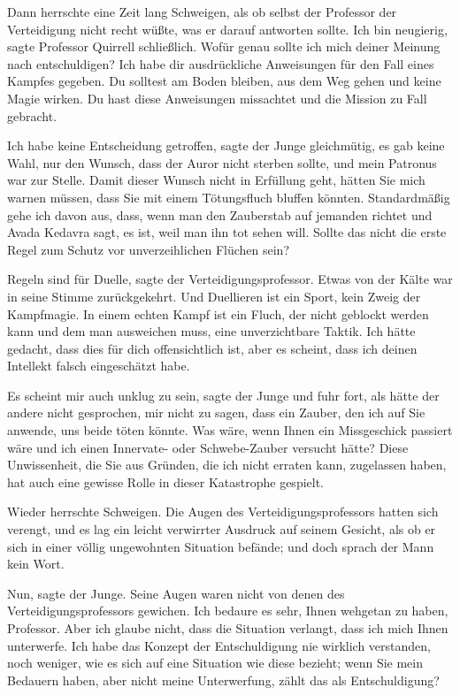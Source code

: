 Dann herrschte eine Zeit lang Schweigen, als ob selbst der Professor der
Verteidigung nicht recht wüßte, was er darauf antworten sollte. \glqq{}Ich bin
neugierig\grqq{}, sagte Professor Quirrell schließlich. \glqq{}Wofür genau sollte
ich mich deiner Meinung nach entschuldigen? Ich habe dir ausdrückliche
Anweisungen für den Fall eines Kampfes gegeben. Du solltest am Boden bleiben,
aus dem Weg gehen und keine Magie wirken. Du hast diese Anweisungen missachtet
und die Mission zu Fall gebracht.\grqq{}

\glqq{}Ich habe keine Entscheidung getroffen\grqq{}, sagte der Junge gleichmütig,
\glqq{}es gab keine Wahl, nur den Wunsch, dass der Auror nicht sterben sollte,
und mein Patronus war zur Stelle. Damit dieser Wunsch nicht in Erfüllung geht,
hätten Sie mich warnen müssen, dass Sie mit einem Tötungsfluch bluffen könnten.
Standardmäßig gehe ich davon aus, dass, wenn man den Zauberstab auf jemanden
richtet und Avada Kedavra sagt, es ist, weil man ihn tot sehen will. Sollte das
nicht die erste Regel zum Schutz vor unverzeihlichen Flüchen sein?\grqq{}

\glqq{}Regeln sind für Duelle\grqq{}, sagte der Verteidigungsprofessor. Etwas von
der Kälte war in seine Stimme zurückgekehrt. \glqq{}Und Duellieren ist ein Sport,
kein Zweig der Kampfmagie. In einem echten Kampf ist ein Fluch, der nicht
geblockt werden kann und dem man ausweichen muss, eine unverzichtbare Taktik.
Ich hätte gedacht, dass dies für dich offensichtlich ist, aber es scheint, dass
ich deinen Intellekt falsch eingeschätzt habe.\grqq{}

\glqq{}Es scheint mir auch unklug zu sein\grqq{}, sagte der Junge und fuhr fort,
als hätte der andere nicht gesprochen, \glqq{}mir nicht zu sagen, dass ein
Zauber, den ich auf Sie anwende, uns beide töten könnte. Was wäre, wenn Ihnen
ein Missgeschick passiert wäre und ich einen Innervate- oder Schwebe-Zauber
versucht hätte? Diese Unwissenheit, die Sie aus Gründen, die ich nicht erraten
kann, zugelassen haben, hat auch eine gewisse Rolle in dieser Katastrophe
gespielt.\grqq{}

Wieder herrschte Schweigen. Die Augen des Verteidigungsprofessors hatten sich
verengt, und es lag ein leicht verwirrter Ausdruck auf seinem Gesicht, als ob er
sich in einer völlig ungewohnten Situation befände; und doch sprach der Mann
kein Wort.

\glqq{}Nun\grqq{}, sagte der Junge. Seine Augen waren nicht von denen des
Verteidigungsprofessors gewichen. \glqq{}Ich bedaure es sehr, Ihnen wehgetan zu
haben, Professor. Aber ich glaube nicht, dass die Situation verlangt, dass ich
mich Ihnen unterwerfe. Ich habe das Konzept der Entschuldigung nie wirklich
verstanden, noch weniger, wie es sich auf eine Situation wie diese bezieht; wenn
Sie mein Bedauern haben, aber nicht meine Unterwerfung, zählt das als
Entschuldigung?\grqq{}

